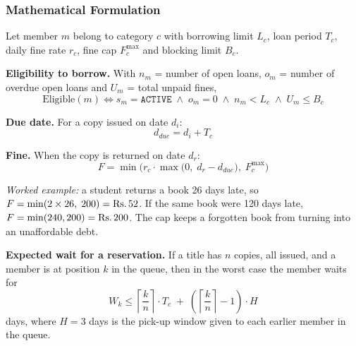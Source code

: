 \documentclass[11pt,a4paper]{report}
\begin{document}
\subsubsection{Mathematical Formulation}
Let member $m$ belong to category $c$ with borrowing limit $L_c$, loan period $T_c$, daily fine rate $r_c$, fine cap $F^{\max}_c$ and blocking limit $B_c$.

\textbf{Eligibility to borrow.} With $n_m$ = number of open loans, $o_m$ = number of overdue open loans and $U_m$ = total unpaid fines,
$$\text{Eligible}(m) \iff s_m = \texttt{ACTIVE} \;\wedge\; o_m = 0 \;\wedge\; n_m < L_c \;\wedge\; U_m \le B_c$$

\textbf{Due date.} For a copy issued on date $d_i$:
$$d_{due} = d_i + T_c$$

\textbf{Fine.} When the copy is returned on date $d_r$:
$$F = \min\Big(r_c \cdot \max\big(0,\; d_r - d_{due}\big),\; F^{\max}_c\Big)$$

\textit{Worked example:} a student returns a book 26 days late, so $F = \min(2 \times 26,\; 200) = \text{Rs.\,}52$. If the same book were 120 days late, $F = \min(240, 200) = \text{Rs.\,}200$. The cap keeps a forgotten book from turning into an unaffordable debt.

\textbf{Expected wait for a reservation.} If a title has $n$ copies, all issued, and a member is at position $k$ in the queue, then in the worst case the member waits for
$$W_k \le \left\lceil \frac{k}{n} \right\rceil \cdot T_c \;+\; \left(\left\lceil \frac{k}{n} \right\rceil - 1\right)\cdot H$$
days, where $H = 3$ days is the pick-up window given to each earlier member in the queue.
\end{document}
